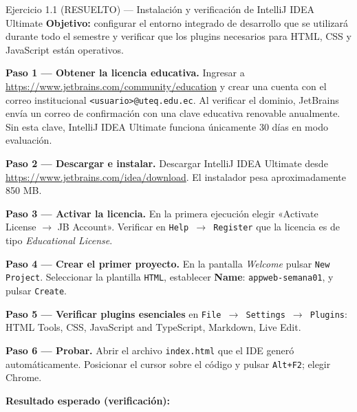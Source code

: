 \documentclass[11pt,a4paper,openany]{book}
\begin{document}
\begin{cajaejercicio}{Ejercicio 1.1 (RESUELTO) --- Instalación y verificación de IntelliJ IDEA Ultimate}
\textbf{Objetivo:} configurar el entorno integrado de desarrollo que
se utilizará durante todo el semestre y verificar que los plugins
necesarios para HTML, CSS y JavaScript están operativos.

\textbf{Paso 1 --- Obtener la licencia educativa.} Ingresar a
\url{https://www.jetbrains.com/community/education} y crear una
cuenta con el correo institucional \texttt{<usuario>@uteq.edu.ec}. Al
verificar el dominio, JetBrains envía un correo de confirmación con
una clave educativa renovable anualmente. Sin esta clave, IntelliJ
IDEA Ultimate funciona únicamente 30 días en modo evaluación.

\textbf{Paso 2 --- Descargar e instalar.} Descargar IntelliJ IDEA
Ultimate desde \url{https://www.jetbrains.com/idea/download}. El
instalador pesa aproximadamente 850 MB.

\textbf{Paso 3 --- Activar la licencia.} En la primera ejecución
elegir «Activate License $\rightarrow$ JB Account». Verificar en
\texttt{Help $\rightarrow$ Register} que la licencia es de tipo
\emph{Educational License}.

\textbf{Paso 4 --- Crear el primer proyecto.} En la pantalla
\emph{Welcome} pulsar \texttt{New Project}. Seleccionar la plantilla
\texttt{HTML}, establecer \textbf{Name}: \texttt{appweb-semana01},
y pulsar \texttt{Create}.

\textbf{Paso 5 --- Verificar plugins esenciales} en
\texttt{File $\rightarrow$ Settings $\rightarrow$ Plugins}: HTML
Tools, CSS, JavaScript and TypeScript, Markdown, Live Edit.

\textbf{Paso 6 --- Probar.} Abrir el archivo \texttt{index.html} que
el IDE generó automáticamente. Posicionar el cursor sobre el código
y pulsar \texttt{Alt+F2}; elegir Chrome.

\textbf{Resultado esperado (verificación):}

\begin{center}
\end{center}


\end{cajaejercicio}
\end{document}
